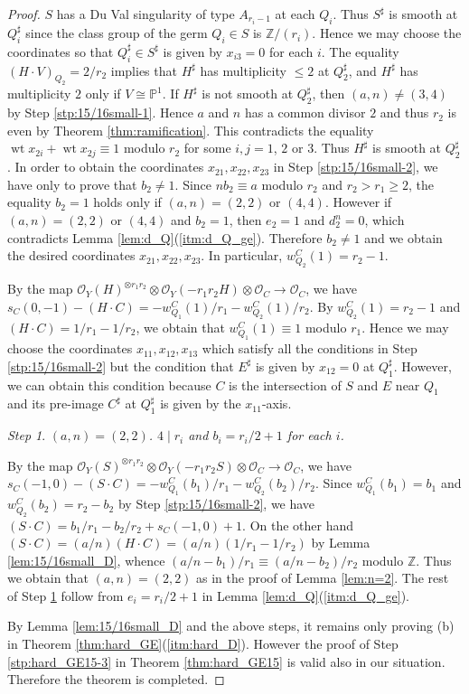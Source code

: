 \documentclass[a4paper,11pt]{amsart}
\theoremstyle{definition}
\theoremstyle{remark}
\newtheorem{step}{Step}
\numberwithin{equation}{section}
\newcommand{\bP}{{\mathbb P}}
\newcommand{\bZ}{{\mathbb Z}}
\newcommand{\cO}{{\mathcal O}}
\newcommand{\wt}{\operatorname{wt}}
\begin{document}
\begin{proof}
$S$ has a Du Val singularity of type $A_{r_i-1}$ at each $Q_i$.
Thus $S^\sharp$ is smooth at $Q_i^\sharp$
since the class group of the germ $Q_i \in S$ is $\bZ/(r_i)$.
Hence we may choose the coordinates so that
$Q_i^\sharp \in S^\sharp$ is given by $x_{i3}=0$ for each $i$.
The equality $(H \cdot V)_{Q_2}=2/r_2$ implies that
$H^\sharp$ has multiplicity $\le 2$ at $Q_2^\sharp$,
and $H^\sharp$ has multiplicity $2$ only if $V \cong \bP^1$.
If $H^\sharp$ is not smooth at $Q_2^\sharp$,
then $(a,n)\neq(3,4)$ by Step \ref{stp:15/16small-1}.
Hence $a$ and $n$ has a common divisor $2$
and thus $r_2$ is even by Theorem \ref{thm:ramification}.
This contradicts the equality
$\wt x_{2i} +\wt x_{2j} \equiv 1$ modulo $r_2$ for some $i,j=1$, $2$ or $3$.
Thus $H^\sharp$ is smooth at $Q_2^\sharp$.
In order to obtain the coordinates $x_{21},x_{22},x_{23}$
in Step \ref{stp:15/16small-2},
we have only to prove that $b_2\neq1$.
Since $nb_2 \equiv a$ modulo $r_2$ and $r_2>r_1\ge2$,
the equality $b_2=1$ holds only if $(a,n)=(2,2)$ or $(4,4)$.
However if $(a,n)=(2,2)$ or $(4,4)$ and $b_2=1$,
then $e_2=1$ and $d_2^n=0$,
which contradicts Lemma \ref{lem:d_Q}(\ref{itm:d_Q_ge}).
Therefore $b_2\neq1$ and
we obtain the desired coordinates $x_{21},x_{22},x_{23}$.
In particular, $w_{Q_2}^C(1)=r_2-1$.

By the map
$\cO_Y(H)^{\otimes r_1r_2} \otimes \cO_Y(-r_1r_2H) \otimes \cO_C \to \cO_C$,
we have $s_C(0,-1)-(H \cdot C)=-w_{Q_1}^C(1)/r_1-w_{Q_2}^C(1)/r_2$.
By $w_{Q_2}^C(1)=r_2-1$ and $(H \cdot C)=1/r_1-1/r_2$,
we obtain that $w_{Q_1}^C(1) \equiv 1$ modulo $r_1$.
Hence we may choose the coordinates $x_{11},x_{12},x_{13}$
which satisfy all the conditions in Step \ref{stp:15/16small-2}
but the condition that $E^\sharp$ is given by $x_{12}=0$ at $Q_1^\sharp$.
However,
we can obtain this condition
because $C$ is the intersection of $S$ and $E$ near $Q_1$
and its pre-image $C^\sharp$ at $Q_1^\sharp$ is given by the $x_{11}$-axis.

\begin{step}\label{stp:15/16small-3}
\itshape
$(a,n)=(2,2)$.
$4 \mid r_i$ and $b_i=r_i/2+1$ for each $i$.
\end{step}

By the map
$\cO_Y(S)^{\otimes r_1r_2} \otimes \cO_Y(-r_1r_2S) \otimes \cO_C \to \cO_C$,
we have $s_C(-1,0)-(S \cdot C)=-w_{Q_1}^C(b_1)/r_1-w_{Q_2}^C(b_2)/r_2$.
Since $w_{Q_1}^C(b_1)=b_1$ and $w_{Q_2}^C(b_2)=r_2-b_2$
by Step \ref{stp:15/16small-2},
we have $(S \cdot C)=b_1/r_1-b_2/r_2+s_C(-1,0)+1$.
On the other hand $(S \cdot C)=(a/n)(H \cdot C)=(a/n)(1/r_1-1/r_2)$
by Lemma \ref{lem:15/16small_D},
whence $(a/n-b_1)/r_1 \equiv (a/n-b_2)/r_2$ modulo $\bZ$.
Thus we obtain that $(a,n)=(2,2)$ as in the proof of Lemma \ref{lem:n=2}.
The rest of Step \ref{stp:15/16small-3} follow from $e_i=r_i/2+1$
in Lemma \ref{lem:d_Q}(\ref{itm:d_Q_ge}).

By Lemma \ref{lem:15/16small_D} and the above steps,
it remains only proving (b) in Theorem \ref{thm:hard_GE}(\ref{itm:hard_D}).
However the proof of Step \ref{stp:hard_GE15-3} in Theorem \ref{thm:hard_GE15}
is valid also in our situation.
Therefore the theorem is completed.
\setcounter{step}{0}
\end{proof}
\end{document}
